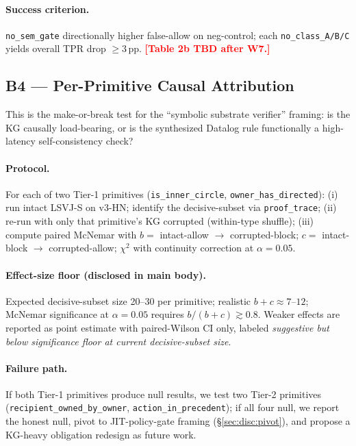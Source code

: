 \documentclass{article}
\theoremstyle{definition}
\newcommand{\placeholder}[1]{\textcolor{red}{\textbf{[#1]}}}
\begin{document}
\paragraph{Success criterion.}
\texttt{no\_sem\_gate} directionally higher false-allow on
neg-control; each \texttt{no\_class\_A/B/C} yields overall TPR drop
$\ge 3$\,pp. \placeholder{Table 2b TBD after W7.}

\subsection{B4 --- Per-Primitive Causal Attribution}
\label{sec:exp:b4}
This is the make-or-break test for the ``symbolic substrate
verifier'' framing: is the KG causally load-bearing, or is the
synthesized Datalog rule functionally a high-latency self-consistency
check?

\paragraph{Protocol.}
For each of two Tier-1 primitives
(\texttt{is\_inner\_circle}, \texttt{owner\_has\_directed}):
(i) run intact LSVJ-S on v3-HN; identify the decisive-subset via
\texttt{proof\_trace};
(ii) re-run with only that primitive's KG corrupted (within-type
shuffle);
(iii) compute paired McNemar with $b{=}$ intact-allow $\to$
corrupted-block; $c{=}$ intact-block $\to$ corrupted-allow; $\chi^2$
with continuity correction at $\alpha = 0.05$.

\paragraph{Effect-size floor (disclosed in main body).}
Expected decisive-subset size 20--30 per primitive; realistic
$b+c \approx 7\text{--}12$; McNemar significance at
$\alpha = 0.05$ requires $b/(b+c) \gtrsim 0.8$. Weaker effects are
reported as point estimate with paired-Wilson CI only, labeled
\emph{suggestive but below significance floor at current
decisive-subset size}.

\paragraph{Failure path.}
If both Tier-1 primitives produce null results, we test two Tier-2
primitives (\texttt{recipient\_owned\_by\_owner},
\texttt{action\_in\_precedent}); if all four null, we report the
honest null, pivot to JIT-policy-gate framing
(\S\ref{sec:disc:pivot}), and propose a KG-heavy obligation redesign
as future work.
\end{document}
